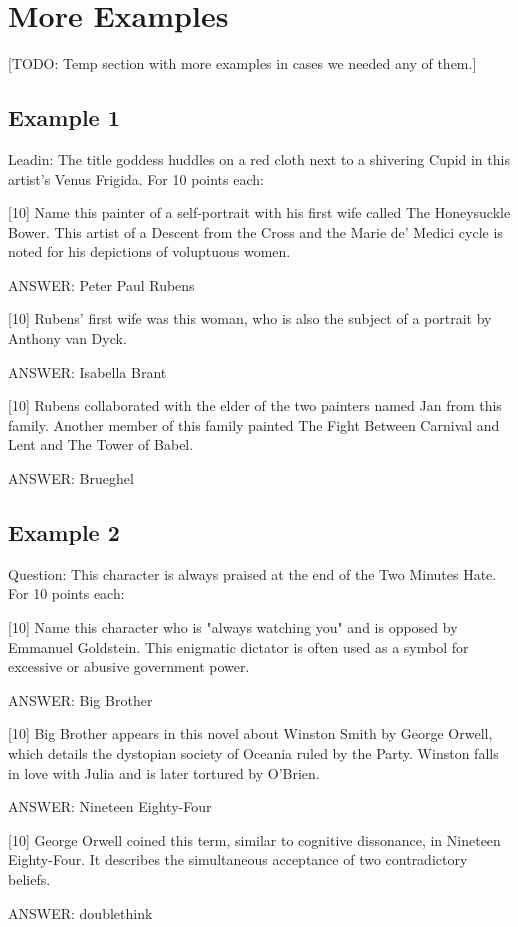 \section{More Examples}
 \color{red} [TODO: Temp section with more examples in cases we
 needed any of them.]\color{black}
 
\subsection*{Example 1}
Leadin: The title goddess huddles on a red cloth next to a shivering Cupid in this artist's Venus Frigida. For 10 points each:

[10] Name this painter of a self-portrait with his first wife called The Honeysuckle Bower. This artist of a Descent from the Cross and the Marie de' Medici cycle is noted for his depictions of voluptuous women.

ANSWER: Peter Paul Rubens

[10] Rubens' first wife was this woman, who is also the subject of a portrait by Anthony van Dyck.

ANSWER: Isabella Brant

[10] Rubens collaborated with the elder of the two painters named Jan from this family. Another member of this family painted The Fight Between Carnival and Lent and The Tower of Babel.

ANSWER: Brueghel


\subsection*{Example 2}
Question: This character is always praised at the end of the Two Minutes Hate. For 10 points each:

[10] Name this character who is "always watching you" and is opposed by Emmanuel Goldstein. This enigmatic dictator is often used as a symbol for excessive or abusive government power.

ANSWER: Big Brother

[10] Big Brother appears in this novel about Winston Smith by George Orwell, which details the dystopian society of Oceania ruled by the Party. Winston falls in love with Julia and is later tortured by O'Brien.

ANSWER: Nineteen Eighty-Four

[10] George Orwell coined this term, similar to cognitive dissonance, in Nineteen Eighty-Four. It describes the simultaneous acceptance of two contradictory beliefs.

ANSWER: doublethink
